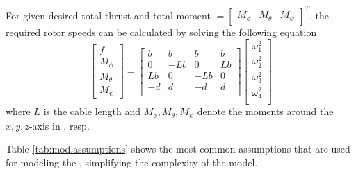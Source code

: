 For given desired total thrust  and total moment $=\begin{bmatrix}	M_\phi&M_\theta&M_\psi	\end{bmatrix}^T  $, the required rotor speeds can be calculated by solving the following equation
\begin{equation}\label{eq:omega_i}
\begin{bmatrix}
f\\M_\phi\\M_\theta\\M_\psi
\end{bmatrix}=
\begin{bmatrix}
b&b&b&b\\
0&-Lb&0&Lb\\
Lb&0&-Lb&0\\
-d&d&-d&d\\
\end{bmatrix}
\begin{bmatrix}
\omega_1^2\\
\omega_2^2\\
\omega_3^2\\
\omega_4^2\\
\end{bmatrix}
\end{equation}
where $ L $ is the cable length and $ M_\phi, M_\theta, M_\psi $ denote the moments around the $ x, y, z $-axis in \BF, resp. 

Table \ref{tab:mod.assumptions} shows the most common assumptions that are used for modeling the , simplifying the complexity of the model.

